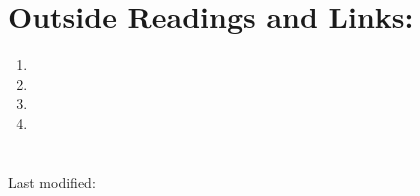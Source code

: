 \documentclass[12pt]{article}
\begin{document}



\hr

\section*{Outside Readings and Links:}
\begin{enumerate}
    \item
    \item
    \item
    \item
\end{enumerate}

\section*{\solutionsname} \loadSolutions

\hr

\mydisclaim \myfooter

Last modified:  \flastmod
\end{document}
